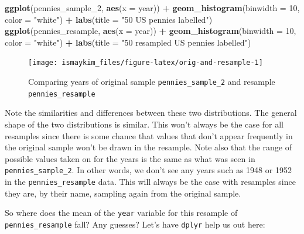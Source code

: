 \documentclass[12pt, krantz2,]{krantz}
\makeatletter
\newenvironment{Shaded}{\begin{snugshade}}{\end{snugshade}}
\newcommand{\DataTypeTok}[1]{\textcolor[rgb]{0.27,0.27,0.27}{#1}}
\newcommand{\DecValTok}[1]{\textcolor[rgb]{0.06,0.06,0.06}{#1}}
\newcommand{\KeywordTok}[1]{\textcolor[rgb]{0.27,0.27,0.27}{\textbf{#1}}}
\newcommand{\NormalTok}[1]{#1}
\newcommand{\OperatorTok}[1]{\textcolor[rgb]{0.43,0.43,0.43}{\textbf{#1}}}
\newcommand{\StringTok}[1]{\textcolor[rgb]{0.5,0.5,0.5}{#1}}
\newenvironment{kframe}{%
\medskip{}
\setlength{\fboxsep}{.8em}
 \def\at@end@of@kframe{}%
 \ifinner\ifhmode%
  \def\at@end@of@kframe{\end{minipage}}%
  \begin{minipage}{\columnwidth}%
 \fi\fi%
 \def\FrameCommand##1{\hskip\@totalleftmargin \hskip-\fboxsep
 \colorbox{shadecolor}{##1}\hskip-\fboxsep
     \hskip-\linewidth \hskip-\@totalleftmargin \hskip\columnwidth}%
 \MakeFramed {\advance\hsize-\width
   \@totalleftmargin\z@ \linewidth\hsize
   \@setminipage}}%
 {\par\unskip\endMakeFramed%
 \at@end@of@kframe}
\renewenvironment{Shaded}{\begin{kframe}}{\end{kframe}}
\makeatother
\begin{document}
\begin{Shaded}
\begin{Highlighting}[]
\KeywordTok{ggplot}\NormalTok{(pennies_sample_}\DecValTok{2}\NormalTok{, }\KeywordTok{aes}\NormalTok{(}\DataTypeTok{x =}\NormalTok{ year)) }\OperatorTok{+}
\StringTok{  }\KeywordTok{geom_histogram}\NormalTok{(}\DataTypeTok{binwidth =} \DecValTok{10}\NormalTok{, }\DataTypeTok{color =} \StringTok{"white"}\NormalTok{) }\OperatorTok{+}
\StringTok{  }\KeywordTok{labs}\NormalTok{(}\DataTypeTok{title =} \StringTok{"50 US pennies labelled"}\NormalTok{)}
\KeywordTok{ggplot}\NormalTok{(pennies_resample, }\KeywordTok{aes}\NormalTok{(}\DataTypeTok{x =}\NormalTok{ year)) }\OperatorTok{+}
\StringTok{  }\KeywordTok{geom_histogram}\NormalTok{(}\DataTypeTok{binwidth =} \DecValTok{10}\NormalTok{, }\DataTypeTok{color =} \StringTok{"white"}\NormalTok{) }\OperatorTok{+}
\StringTok{  }\KeywordTok{labs}\NormalTok{(}\DataTypeTok{title =} \StringTok{"50 resampled US pennies labelled"}\NormalTok{)}
\end{Highlighting}
\end{Shaded}



\begin{figure}

{\centering \texttt{[image: ismaykim\_files/figure-latex/orig-and-resample-1]} 

}

\caption{Comparing years of original sample \texttt{pennies\_sample\_2} and resample \texttt{pennies\_resample}}\label{fig:orig-and-resample}
\end{figure}

Note the similarities and differences between these two distributions. The general shape of the two distributions is similar. This won't always be the case for all resamples since there is some chance that values that don't appear frequently in the original sample won't be drawn in the resample. Note also that the range of possible values taken on for the years is the same as what was seen in \texttt{pennies\_sample\_2}. In other words, we don't see any years such as 1948 or 1952 in the \texttt{pennies\_resample} data. This will always be the case with resamples since they are, by their name, sampling again from the original sample.

So where does the mean of the \texttt{year} variable for this resample of \texttt{pennies\_resample} fall? Any guesses? Let's have \texttt{dplyr} help us out here:

\begin{Shaded}
\end{Shaded}
\end{document}

